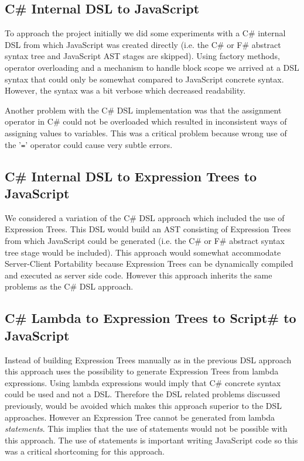 	\subsection{C\# Internal DSL to JavaScript} %
	\label{ssub:c_internal_dsl_to_javascript}
		To approach the project initially we did some experiments with a C\# internal DSL from which JavaScript was created directly (i.e. the C\# or F\# abstract syntax tree and JavaScript AST stages are skipped). Using factory methods, operator overloading and a mechanism to handle block scope we arrived at a DSL syntax that could only be somewhat compared to JavaScript concrete syntax. However, the syntax was a bit verbose which decreased readability. 

		Another problem with the C\# DSL implementation was that the assignment operator in C\# could not be overloaded which resulted in inconsistent ways of assigning values to variables. This was a critical problem because wrong use of the '\texttt{=}' operator could cause very subtle errors.


	\subsection{C\# Internal DSL to Expression Trees to JavaScript} %
	\label{ssub:c_internal_dsl_to_expression_trees_to_javascript}

		We considered a variation of the C\# DSL approach which included the use of Expression Trees. This DSL would build an AST consisting of Expression Trees from which JavaScript could be generated (i.e. the C\# or F\# abstract syntax tree stage would be included). This approach would somewhat accommodate Server-Client Portability because Expression Trees can be dynamically compiled and executed as server side code. However this approach inherits the same problems as the C\# DSL approach.

	\subsection{C\# Lambda to Expression Trees to Script\# to JavaScript} %
	\label{ssub:c_lambda_to_expression_trees_to_script_to_javascript}
		Instead of building Expression Trees manually as in the previous DSL approach this approach uses the possibility to generate Expression Trees from lambda expressions. Using lambda expressions would imply that C\# concrete syntax could be used and not a DSL. Therefore the DSL related problems discussed previously, would be avoided which makes this approach superior to the DSL approaches. However an Expression Tree cannot be generated from lambda \emph{statements}. This implies that the use of statements would not be possible with this approach. The use of statements is important writing JavaScript code so this was a critical shortcoming for this approach.

